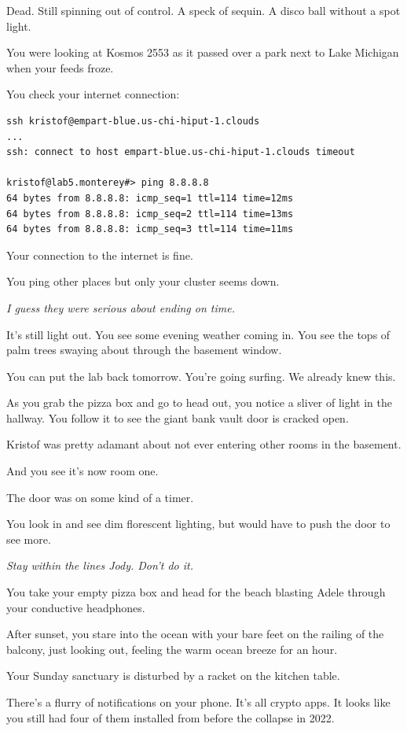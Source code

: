 \documentclass[a5paper, symmetric]{tufte-book}
\begin{document}
Dead. Still spinning out of control. A speck of sequin. A disco ball without a spot light. 

You were looking at Kosmos 2553 as it passed over a park next to Lake Michigan when your feeds froze.

You check your internet connection:

\begin{Verbatim}
ssh kristof@empart-blue.us-chi-hiput-1.clouds
...
ssh: connect to host empart-blue.us-chi-hiput-1.clouds timeout

kristof@lab5.monterey#> ping 8.8.8.8
64 bytes from 8.8.8.8: icmp_seq=1 ttl=114 time=12ms
64 bytes from 8.8.8.8: icmp_seq=2 ttl=114 time=13ms
64 bytes from 8.8.8.8: icmp_seq=3 ttl=114 time=11ms
\end{Verbatim}

Your connection to the internet is fine. 

You ping other places but only your cluster seems down. 

\textit{I guess they were serious about ending on time.}

It's still light out. You see some evening weather coming in. You see the tops of palm trees swaying about through the basement window. 

You can put the lab back tomorrow. You're going surfing. We already knew this. 

As you grab the pizza box and go to head out, you notice a sliver of light in the hallway. You follow it to see the giant bank vault door is cracked open. 

Kristof was pretty adamant about not ever entering other rooms in the basement. 

And you see it's now room one. 

The door was on some kind of a timer. 

You look in and see dim florescent lighting, but would have to push the door to see more. 

\textit{Stay within the lines Jody. Don't do it.}

You take your empty pizza box and head for the beach blasting Adele through your conductive headphones. 

After sunset, you stare into the ocean with your bare feet on the railing of the balcony, just looking out, feeling the warm ocean breeze for an hour. 

Your Sunday sanctuary is disturbed by a racket on the kitchen table. 

There's a flurry of notifications on your phone. It's all crypto apps. It looks like you still had four of them installed from before the collapse in 2022. 
\end{document}
